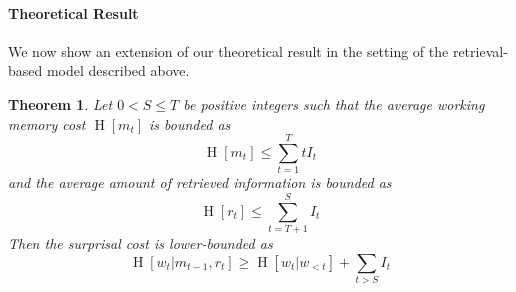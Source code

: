 \documentclass[11pt,letterpaper]{article}
\newcounter{theorem}
\newtheorem{thm}[theorem]{Theorem}
\begin{document}

\paragraph{Theoretical Result}
We now show an extension of our theoretical result in the setting of the retrieval-based model described above.

\begin{thm}
Let $0 < S \leq T$ be positive integers such that the average working memory cost $\operatorname{H}[m_t]$ is bounded as
	\begin{equation}
		\operatorname{H}[m_t] \leq \sum_{t=1}^T t I_t
	\end{equation}
	and the average amount of retrieved information is bounded as
	\begin{equation}
		\operatorname{H}[r_t] \leq \sum_{t=T+1}^S I_t
	\end{equation} %
	Then the surprisal cost is lower-bounded as
	\begin{equation}
		\operatorname{H}[w_t|m_{t-1}, r_t] \geq \operatorname{H}[w_t|w_{<t}] + \sum_{t>S} I_t
	\end{equation}
\end{thm}
\end{document}
